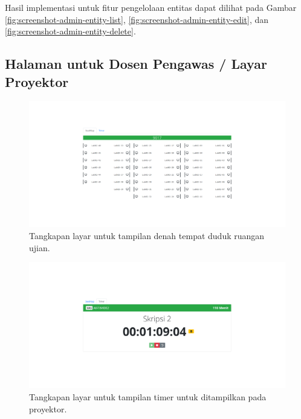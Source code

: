     Hasil implementasi untuk fitur pengelolaan entitas dapat dilihat pada Gambar \ref{fig:screenshot-admin-entity-list},
    \ref{fig:screenshot-admin-entity-edit}, dan \ref{fig:screenshot-admin-entity-delete}.
    
    
    \subsection{Halaman untuk Dosen Pengawas / Layar Proyektor}
    \begin{figure}
        \centering
        \includegraphics[width=0.7\paperwidth]{Gambar/implemented-interface/pengawas/seatmap.png}
        \caption{Tangkapan layar untuk tampilan denah tempat duduk ruangan ujian.}
        \label{fig:screenshot-pengawas-seatmap}
    \end{figure}
    \begin{figure}
        \centering
        \includegraphics[width=0.7\paperwidth]{Gambar/implemented-interface/pengawas/timer.png}
        \caption{Tangkapan layar untuk tampilan timer untuk ditampilkan pada proyektor.}
        \label{fig:screenshot-pengawas-timer}
    \end{figure}
